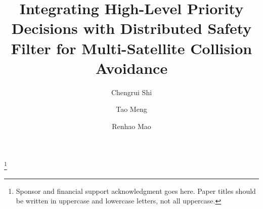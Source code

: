 \documentclass{ifacconf}
\begin{document}
\begin{frontmatter}

\title{Integrating High-Level Priority Decisions with Distributed Safety Filter for Multi-Satellite Collision Avoidance} 

\thanks[footnoteinfo]{Sponsor and financial support acknowledgment
goes here. Paper titles should be written in uppercase and lowercase
letters, not all uppercase.}

\author[First]{Chengrui Shi} 
\author[Second]{Tao Meng} 
\author[Third]{Renhao Mao}

\address[First]{National Institute of Standards and Technology, 
   Boulder, CO 80305 USA (e-mail: author@ boulder.nist.gov).}
\address[Second]{Colorado State University, 
   Fort Collins, CO 80523 USA (e-mail: author@lamar. colostate.edu)}
\address[Third]{Electrical Engineering Department, 
   Seoul National University, Seoul, Korea, (e-mail: author@snu.ac.kr)}

\begin{abstract}                %


\end{abstract}
\end{frontmatter}
\end{document}
